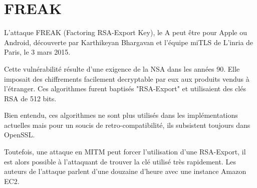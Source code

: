 \chapter{FREAK}
\label{chap:freak}

L'attaque FREAK (Factoring RSA-Export Key), 
le A peut être pour Apple ou Android, découverte
par Karthikeyan Bhargavan et l'équipe miTLS de L'inria
de Paris, le 3 mars 2015.


Cette vulnérabilité résulte d'une exigence de la NSA dans
les années 90. Elle imposait des chiffrements
facilement decryptable par eux aux produits vendus à l'étranger.
Ces algorithmes furent baptisés "RSA-Export" et utilisaient
des clés RSA de 512 bits.


Bien entendu, ces algorithmes ne sont plus utilisés dans les
implémentations actuelles mais pour un soucis de retro-compatibilité, ils subsistent toujours dans OpenSSL.


Toutefois, une attaque en MITM peut forcer l'utilisation d'une
RSA-Export, il est alors possible à l'attaquant de trouver
la clé utilisé très rapidement. Les auteurs de l'attaque parlent
d'une douzaine d'heure avec une instance Amazon EC2.
